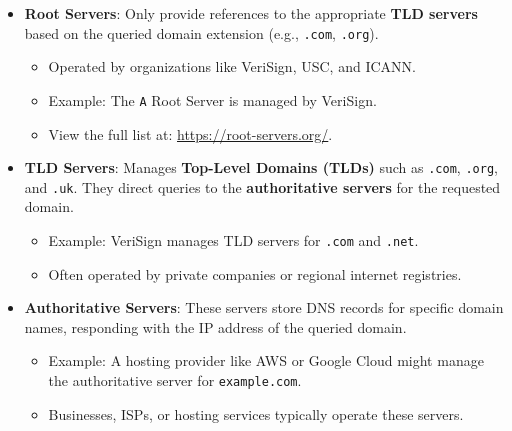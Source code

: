 \begin{Def}

    \begin{itemize}
        \item \textbf{Root Servers}:
        Only provide references to the appropriate \textbf{TLD servers} based on the queried domain extension (e.g., \texttt{.com}, \texttt{.org}).
        \begin{itemize}
            \item Operated by organizations like VeriSign, USC, and ICANN.
            \item Example: The \texttt{A} Root Server is managed by VeriSign.
            \item View the full list at: \url{https://root-servers.org/}.
        \end{itemize}
    
        \item \textbf{TLD Servers}:
        Manages \textbf{Top-Level Domains (TLDs)} such as \texttt{.com}, \texttt{.org}, and \texttt{.uk}. They direct queries to the \textbf{authoritative servers} for the requested domain.
        \begin{itemize}
            \item Example: VeriSign manages TLD servers for \texttt{.com} and \texttt{.net}.
            \item Often operated by private companies or regional internet registries.
        \end{itemize}
    
        \item \textbf{Authoritative Servers}:
        These servers store DNS records for specific domain names, responding with the IP address of the queried domain.
        \begin{itemize}
            \item Example: A hosting provider like AWS or Google Cloud might manage the authoritative server for \texttt{example.com}.
            \item Businesses, ISPs, or hosting services typically operate these servers.
        \end{itemize}
    \end{itemize}
    
    \hfill \cite{iana_root_servers}\cite{cloudflare_dns_server_types}
\end{Def}

\newpage

